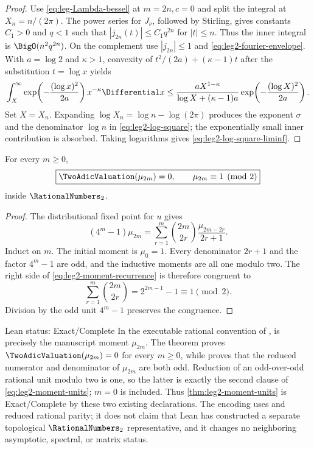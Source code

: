 \begin{proof}
Use \eqref{eq:leg-Lambda-bessel} at $m=2n,c=0$ and split the integral at
$X_n=n/(2\pi)$.  The power series for $J_\nu$, followed by Stirling, gives
constants $C_1>0$ and $q<1$ such that
$|j_{2n}(t)|\le C_1q^{2n}$ for $|t|\le n$.  Thus the inner integral is
$\BigO(n^2q^{2n})$.  On the complement use $|j_{2n}|\le1$ and
\eqref{eq:leg2-fourier-envelope}.  With $a=\log2$ and $\kappa>1$, convexity of
$t^2/(2a)+(\kappa-1)t$ after the substitution $t=\log x$ yields
\[
 \int_X^\infty
 \exp\!\left(-\frac{(\log x)^2}{2a}\right)x^{-\kappa}\Differential x
 \le
 \frac{aX^{1-\kappa}}
 {\log X+(\kappa-1)a}
 \exp\!\left(-\frac{(\log X)^2}{2a}\right).
\]
Set $X=X_n$.  Expanding $\log X_n=\log n-\log(2\pi)$ produces the exponent
$\sigma$ and the denominator $\log n$ in \eqref{eq:leg2-log-square}; the
exponentially small inner contribution is absorbed.  Taking logarithms gives
\eqref{eq:leg2-log-square-liminf}.
\end{proof}

\begin{theorem}
\label{thm:leg2-moment-units}
For every $m\ge0$,
\begin{equation}
 \boxed{\TwoAdicValuation(\mu_{2m})=0,\qquad \mu_{2m}\equiv1\pmod2}
 \label{eq:leg2-moment-units}
\end{equation}
inside $\RationalNumbers_2$.
\end{theorem}

\begin{proof}
The distributional fixed point for $u$ gives
\begin{equation}
 (4^m-1)\mu_{2m}
 =\sum_{r=1}^{m}\binom{2m}{2r}
 \frac{\mu_{2m-2r}}{2r+1}.
 \label{eq:leg2-moment-recurrence}
\end{equation}
Induct on $m$.  The initial moment is $\mu_0=1$.  Every denominator $2r+1$
and the factor $4^m-1$ are odd, and the inductive moments are all one modulo
two.  The right side of \eqref{eq:leg2-moment-recurrence} is therefore
congruent to
\[
 \sum_{r=1}^{m}\binom{2m}{2r}=2^{2m-1}-1\equiv1\pmod2.
\]
Division by the odd unit $4^m-1$ preserves the congruence.
\end{proof}

\begin{statusbox}{Lean status: Exact/Complete}
In the executable rational convention of ,
 is precisely the manuscript moment $\mu_{2m}$.
The theorem  proves
$\TwoAdicValuation(\mu_{2m})=0$ for every $m\ge0$, while
 proves that the reduced numerator and denominator
of $\mu_{2m}$ are both odd.  Reduction of an odd-over-odd rational unit modulo
two is one, so the latter is exactly the second clause of
\eqref{eq:leg2-moment-units}; $m=0$ is included.  Thus
\cref{thm:leg2-moment-units} is Exact/Complete by these two existing
declarations.  The encoding uses  and reduced rational
parity; it does not claim that Lean has constructed a separate topological
$\RationalNumbers_2$ representative, and it changes no neighboring asymptotic,
spectral, or matrix status.
\end{statusbox}

